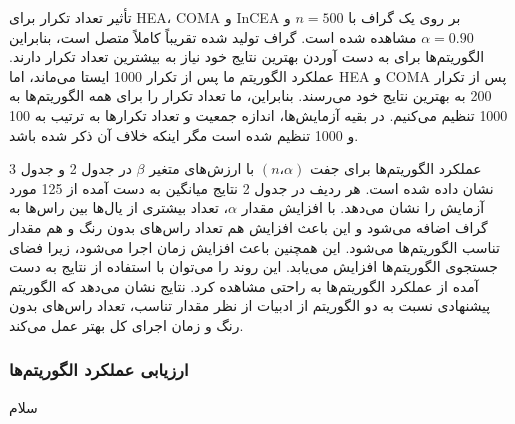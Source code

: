 \documentclass[a4paper,10pt]{article}
\begin{document}
                تأثیر تعداد تکرار برای HEA، COMA و InCEA بر روی یک گراف با $n = 500$ و $\alpha = 0.90$ مشاهده شده است. گراف تولید شده تقریباً کاملاً متصل است، بنابراین الگوریتم‌ها برای به دست آوردن بهترین نتایج خود نیاز به بیشترین تعداد تکرار دارند. عملکرد الگوریتم ما پس از تکرار 1000 ایستا می‌ماند، اما HEA و COMA پس از تکرار 200 به بهترین نتایج خود می‌رسند. بنابراین، ما تعداد تکرار را برای همه الگوریتم‌ها به 1000 تنظیم می‌کنیم. در بقیه آزمایش‌ها، اندازه جمعیت و تعداد تکرارها به ترتیب به 100 و 1000 تنظیم شده است مگر اینکه خلاف آن ذکر شده باشد.

                عملکرد الگوریتم‌ها برای جفت $(n، \alpha)$ با ارزش‌های متغیر $\beta$ در جدول 2 و جدول 3 نشان داده شده است. هر ردیف در جدول 2 نتایج میانگین به دست آمده از 125 مورد آزمایش را نشان می‌دهد. با افزایش مقدار $\alpha$، تعداد بیشتری از یال‌ها بین راس‌ها به گراف اضافه می‌شود و این باعث افزایش هم تعداد راس‌های بدون رنگ و هم مقدار تناسب الگوریتم‌ها می‌شود. این همچنین باعث افزایش زمان اجرا می‌شود، زیرا فضای جستجوی الگوریتم‌ها افزایش می‌یابد. این روند را می‌توان با استفاده از نتایج به دست آمده از عملکرد الگوریتم‌ها به راحتی مشاهده کرد. نتایج نشان می‌دهد که الگوریتم پیشنهادی نسبت به دو الگوریتم از ادبیات از نظر مقدار تناسب، تعداد راس‌های بدون رنگ و زمان اجرای کل بهتر عمل می‌کند.

            \subsubsection{ارزیابی عملکرد الگوریتم‌ها}

                سلام
\end{document}
